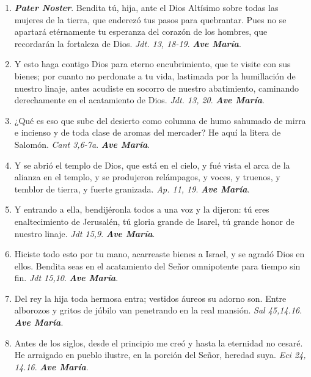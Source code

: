 \documentclass[../../devocionario.tex]{subfiles}
\begin{document}
    \begin{enumerate}
    
        \item \textbf{\textit{Pater Noster}}. Bendita tú, hija, ante el Dios Altísimo sobre todas las mujeres de la tierra, 
            que enderezó tus pasos para quebrantar. Pues no se apartará etérnamente tu esperanza del corazón de los hombres, 
            que recordarán la fortaleza de Dios. \textit{Jdt. 13, 18-19}. \textbf{\textit{Ave María}}.

        \item Y esto haga contigo Dios para eterno encubrimiento, que te visite con sus bienes; por cuanto no perdonate a tu vida, 
            lastimada por la humillación de nuestro linaje, antes acudiste en socorro de nuestro abatimiento, 
            caminando derechamente en el acatamiento de Dios. \textit{Jdt. 13, 20}. \textbf{\textit{Ave María}}.

        \item ¿Qué es eso que sube del desierto como columna de humo sahumado de mirra e incienso y de toda clase de aromas del mercader? 
            He aquí la litera de Salomón. \textit{Cant 3,6-7a}. \textbf{\textit{Ave María}}.

        \item Y se abrió el templo de Dios, que está en el cielo, y fué vista el arca de la alianza en el templo, 
            y se produjeron relámpagos, y voces, y truenos, y temblor de tierra, y fuerte granizada. \textit{Ap. 11, 19}. \textbf{\textit{Ave María}}.

        \item Y entrando a ella, bendijéronla todos a una voz y la dijeron: tú eres enaltecimiento de Jerusalén, 
            tú gloria grande de Isarel, tú grande honor de nuestro linaje. \textit{Jdt 15,9}. \textbf{\textit{Ave María}}.

        \item Hiciste todo esto por tu mano, acarreaste bienes a Israel, y se agradó Dios en ellos. 
            Bendita seas en el acatamiento del Señor omnipotente para tiempo sin fin. \textit{Jdt 15,10}. \textbf{\textit{Ave María}}.

        \item Del rey la hija toda hermosa entra; vestidos áureos su adorno son. Entre alborozos y gritos de 
            júbilo van penetrando en la real mansión. \textit{Sal 45,14.16}. \textbf{\textit{Ave María}}.

        \item Antes de los siglos, desde el principio me creó y hasta la eternidad no cesaré. 
            He arraigado en pueblo ilustre, en la porción del Señor, heredad suya. \textit{Eci 24, 14.16}. \textbf{\textit{Ave María}}.


\end{enumerate}
\end{document}
